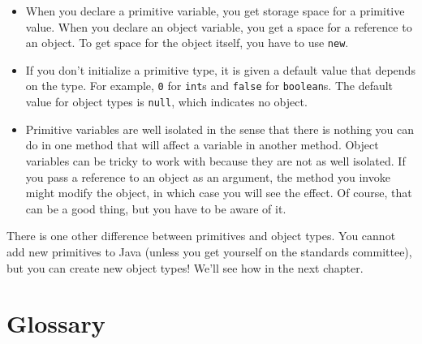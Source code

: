 \begin{itemize}

\item When you declare a primitive variable, you get storage
space for a primitive value.  When you declare an object variable, you
get a space for a reference to an object.  To get space for
the object itself, you have to use {\tt new}.

\item If you don't initialize a primitive type, it is given
a default value that depends on the type.  For example,
{\tt 0} for {\tt int}s and {\tt false} for {\tt boolean}s.
The default value for object types is {\tt null}, which indicates
no object.

\item Primitive variables are well isolated in the sense that there is
nothing you can do in one method that will affect a variable in
another method.  Object variables can be tricky to work with because
they are not as well isolated.  If you pass a reference to an object
as an argument, the method you invoke might modify the object, in which
case you will see the effect.  Of course, that can be a good thing, but you
have to be aware of it.

\end{itemize}

There is one other difference between primitives and object
types.  You cannot add new primitives to Java
(unless you get yourself on the standards committee), but
you can create new object types!  We'll see how in the next
chapter.

\section{Glossary}

